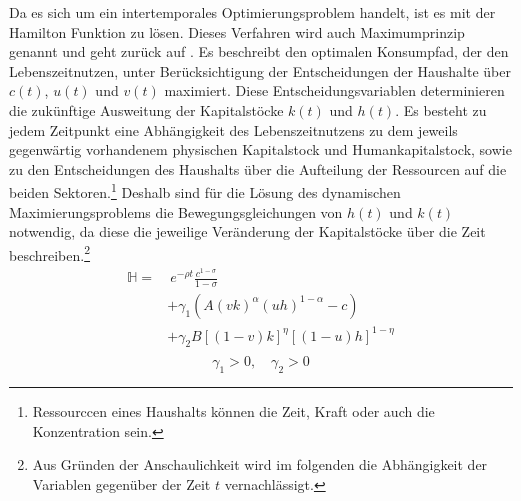 Da es sich um ein intertemporales Optimierungsproblem handelt, ist es mit der Hamilton Funktion zu lösen. Dieses Verfahren wird auch Maximumprinzip genannt und geht zurück auf \citep{Pontryagin.1964}. Es beschreibt den optimalen Konsumpfad, der den Lebenszeitnutzen, unter Berücksichtigung der Entscheidungen der Haushalte über $c(t)$, $u(t)$ und $v(t)$ maximiert. Diese Entscheidungsvariablen determinieren die zukünftige Ausweitung der Kapitalstöcke $k(t)$ und $h(t)$. Es besteht zu jedem Zeitpunkt eine Abhängigkeit des Lebenszeitnutzens zu dem jeweils gegenwärtig vorhandenem physischen Kapitalstock und Humankapitalstock, sowie zu den Entscheidungen des Haushalts über die Aufteilung der Ressourcen auf die beiden Sektoren.\footnote{Ressourccen eines Haushalts können die Zeit, Kraft oder auch die Konzentration sein.} Deshalb sind für die Lösung des dynamischen Maximierungsproblems die Bewegungsgleichungen von $h(t)$ und $k(t)$ notwendig, da diese die jeweilige Veränderung der Kapitalstöcke über die Zeit beschreiben.\footnote{Aus Gründen der Anschaulichkeit wird im folgenden die Abhängigkeit der Variablen gegenüber der Zeit $t$ vernachlässigt.}
\begin{equation}
\begin{split}
\mathbb{H}=&~e^{-\rho t}\frac{c^{1-\sigma}}{1-\sigma}\\
&+\gamma_1(A(vk)^\alpha(uh)^{1-\alpha}-c)\\
&+\gamma_2B[(1-v)k]^{\eta}[(1-u)h]^{1-\eta}\\
\end{split}
\end{equation}
\begin{displaymath} \gamma_1 > 0,\quad \gamma_2 > 0 \end{displaymath}
